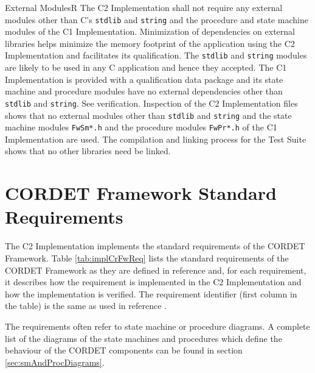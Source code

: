 \documentclass[a4paper,10pt]{article}
\let\stdsection\section
\renewcommand\section{\newpage\stdsection}
\newenvironment{fw_req}[6]
{\addtocounter{subsubsection}{1}
	\hspace{0.2cm}\textbf{CR-\arabic{section}.\arabic{subsection}.\arabic{subsubsection}/#2
	\hspace{0.8cm} #1}
	\vspace{-10pt}
\begin{longtable}{p{2.7cm}P{8.5cm}}
\hline
\textsc{Requirement} & #3 \\
\textsc{Justification} & #4 \\
\textsc{Implementation} & #5  \\ 
\textsc{Verification} & #6  \\
\hline
}
{\end{longtable}}
\begin{document}
\begin{fw_req}{External Modules}{R}
{The C2 Implementation shall not require any external modules other than C's \texttt{stdlib} and \texttt{string} and the procedure and state machine modules of the C1 Implementation.}
{Minimization of dependencies on external libraries helps minimize the memory footprint of the application using the C2 Implementation and facilitates its qualification. The \texttt{stdlib} and \texttt{string} modules are likely to be used in any C application and hence they accepted. The C1 Implementation is provided with a qualification data package and its state machine and procedure modules have no external dependencies other than \texttt{stdlib} and \texttt{string}.}
{See verification.} 
{Inspection of the C2 Implementation files shows that no external modules other than \texttt{stdlib} and \texttt{string} and the state machine modules \texttt{FwSm*.h} and the procedure modules \texttt{FwPr*.h} of the C1 Implementation are used. The compilation and linking process for the Test Suite shows that no other libraries need be linked.}
\end{fw_req}



\appendix
\section{CORDET Framework Standard Requirements}\label{sec:implCrFwReq}
The C2 Implementation implements the standard requirements of the CORDET Framework. 
Table \ref{tab:implCrFwReq} lists the standard requirements of the CORDET Framework as they are defined in reference \cite{ref:cordetfw} and, for each requirement, it describes how the requirement is implemented in the C2 Implementation and how the implementation is verified. The requirement identifier (first column in the table) is the same as used in reference \cite{ref:cordetfw}.

The requirements often refer to state machine or procedure diagrams. A complete list of the diagrams of the state machines and procedures which define the behaviour of the CORDET components can be found in section \ref{sec:smAndProcDiagrams}.
\end{document}
